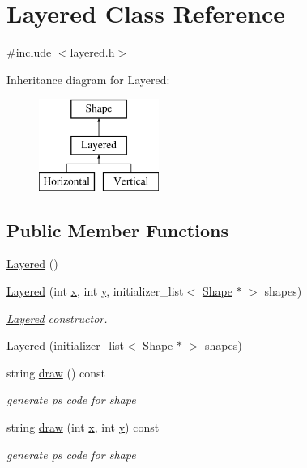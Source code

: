 \hypertarget{class_layered}{}\section{Layered Class Reference}
\label{class_layered}


{\ttfamily \#include $<$layered.\+h$>$}

Inheritance diagram for Layered\+:\begin{figure}[H]
\begin{center}
\leavevmode
\includegraphics[height=3.000000cm]{class_layered}
\end{center}
\end{figure}
\subsection*{Public Member Functions}
\begin{DoxyCompactItemize}
\item 
\hyperlink{class_layered_a6a9d25d4d62c7dc21f93b8384c4f91ce}{Layered} ()
\item 
\hyperlink{class_layered_a5957ef351efc54bcfe38719b3ef5e1a4}{Layered} (int \hyperlink{class_shape_a41e403e73d2949f1a6adfba6032c41ec}{x}, int \hyperlink{class_shape_ac757f715cc5b5681f2c691663ac06f0a}{y}, initializer\+\_\+list$<$ \hyperlink{class_shape}{Shape} $\ast$ $>$ shapes)
\begin{DoxyCompactList}\small\item\em \hyperlink{class_layered}{Layered} constructor. \end{DoxyCompactList}\item 
\hyperlink{class_layered_ac9c58b109dfc7204a3a4be1a185cb1f2}{Layered} (initializer\+\_\+list$<$ \hyperlink{class_shape}{Shape} $\ast$ $>$ shapes)
\item 
string \hyperlink{class_layered_a968cd141e61eb039b997352a318dcae0}{draw} () const 
\begin{DoxyCompactList}\small\item\em generate ps code for shape \end{DoxyCompactList}\item 
string \hyperlink{class_layered_a6eb564ff0646b26fdd4175856b1a0815}{draw} (int \hyperlink{class_shape_a41e403e73d2949f1a6adfba6032c41ec}{x}, int \hyperlink{class_shape_ac757f715cc5b5681f2c691663ac06f0a}{y}) const 
\begin{DoxyCompactList}\small\item\em generate ps code for shape \end{DoxyCompactList}\end{DoxyCompactItemize}
